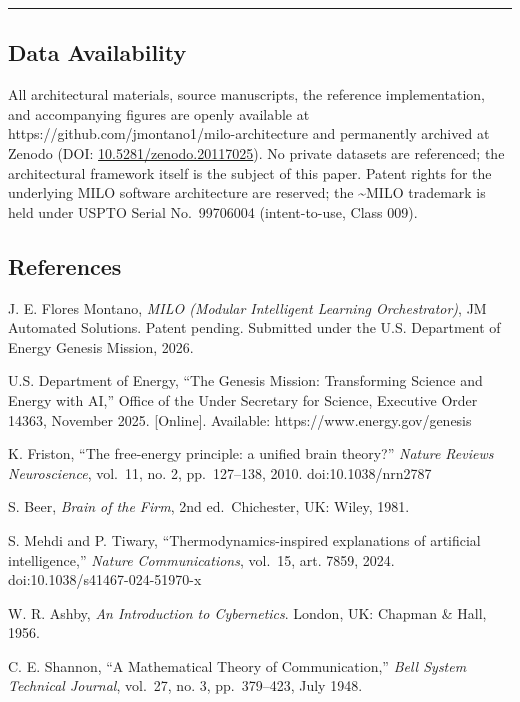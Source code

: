 \begin{center}\rule{0.5\linewidth}{0.5pt}\end{center}

\subsection{Data Availability}\label{data-availability}

All architectural materials, source manuscripts, the reference
implementation, and accompanying figures are openly available at
https://github.com/jmontano1/milo-architecture and permanently archived
at Zenodo (DOI:
\href{https://doi.org/10.5281/zenodo.20117025}{10.5281/zenodo.20117025}).
No private datasets are referenced; the architectural framework itself
is the subject of this paper. Patent rights for the underlying MILO
software architecture are reserved; the \textasciitilde MILO trademark
is held under USPTO Serial No.~99706004 (intent-to-use, Class 009).

\subsection{References}\label{references}

\cite{ref1} J. E. Flores Montano, \emph{MILO (Modular Intelligent Learning
Orchestrator)}, JM Automated Solutions. Patent pending. Submitted under
the U.S. Department of Energy Genesis Mission, 2026.

\cite{ref2} U.S. Department of Energy, ``The Genesis Mission: Transforming
Science and Energy with AI,'' Office of the Under Secretary for Science,
Executive Order 14363, November 2025. {[}Online{]}. Available:
https://www.energy.gov/genesis

\cite{ref3} K. Friston, ``The free-energy principle: a unified brain
theory?'' \emph{Nature Reviews Neuroscience}, vol.~11, no. 2,
pp.~127--138, 2010. doi:10.1038/nrn2787

\cite{ref4} S. Beer, \emph{Brain of the Firm}, 2nd ed.~Chichester, UK:
Wiley, 1981.

\cite{ref5} S. Mehdi and P. Tiwary, ``Thermodynamics-inspired explanations
of artificial intelligence,'' \emph{Nature Communications}, vol.~15,
art. 7859, 2024. doi:10.1038/s41467-024-51970-x

\cite{ref6} W. R. Ashby, \emph{An Introduction to Cybernetics}. London, UK:
Chapman \& Hall, 1956.

\cite{ref7} C. E. Shannon, ``A Mathematical Theory of Communication,''
\emph{Bell System Technical Journal}, vol.~27, no. 3, pp.~379--423, July
1948.

